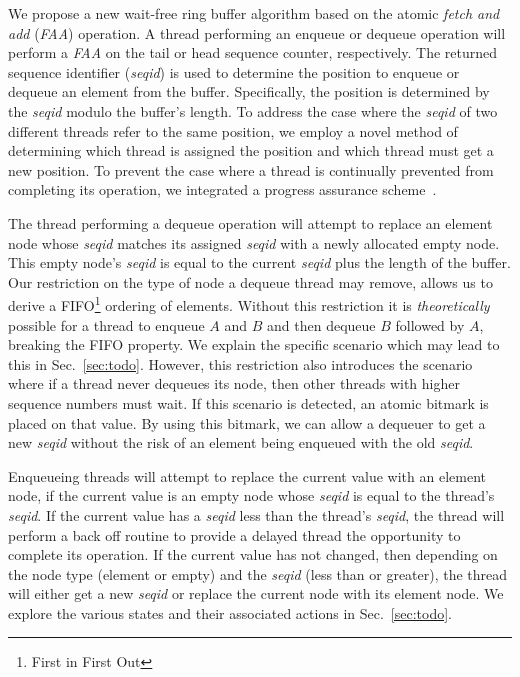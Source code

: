 We propose a new wait-free ring buffer algorithm based on the atomic \textit{fetch and add} (\emph{FAA}) operation.
A thread performing an enqueue or dequeue operation will perform a \emph{FAA} on the tail or head sequence counter, respectively.
The returned sequence identifier (\emph{seqid}) is used to determine the position to enqueue or dequeue an element from the buffer.
Specifically, the position is determined by the \emph{seqid} modulo the buffer's length.
To address the case where the \emph{seqid} of two different threads refer to the same position, we employ a novel method of determining which thread is assigned the position and which thread must get a new position.
To prevent the case where a thread is continually prevented from completing its operation, we integrated a progress assurance scheme~\cite{feldman_vector}.



The thread performing a dequeue operation will attempt to replace an element node whose \emph{seqid} matches its assigned \emph{seqid} with a newly allocated empty node.
This empty node's \emph{seqid} is equal to the current \emph{seqid} plus the length of the buffer.
Our restriction on the type of node a dequeue thread may remove, allows us to derive a FIFO\footnote{First in First Out} ordering of elements.
Without this restriction it is \textit{theoretically} possible for a thread to enqueue $A$ and $B$ and then dequeue $B$ followed by $A$, breaking the FIFO property.
We explain the specific scenario which may lead to this in Sec.~\ref{sec:todo}.
However, this restriction also introduces the scenario where if a thread never dequeues its node, then other threads with higher sequence numbers must wait.
If this scenario is detected, an atomic bitmark is placed on that value.
By using this bitmark, we can allow a dequeuer to get a new \emph{seqid} without the risk of an element being enqueued with the old \emph{seqid}.


Enqueueing threads will attempt to replace the current value with an element node, if the current value is an empty node whose \emph{seqid} is equal to the thread's \emph{seqid}.
If the current value has a \emph{seqid} less than the thread's \emph{seqid}, the thread will perform a back off routine to provide a delayed thread the opportunity to complete its operation.
If the current value has not changed, then depending on the node type (element or empty) and the \emph{seqid} (less than or greater), the thread will either get a new \emph{seqid} or replace the current node with its element node.
We explore the various states and their associated actions in Sec.~\ref{sec:todo}.

